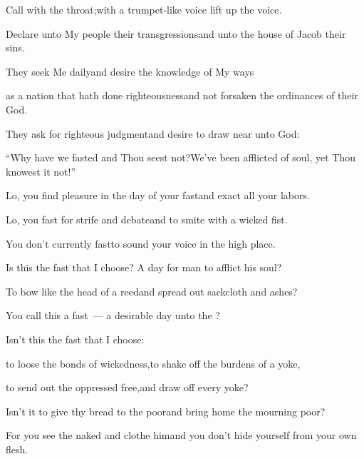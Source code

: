 
\begin{inparaenum}
  \pa{} Call with the throat;\pa{}with a trumpet-like voice lift up the voice.%

  \pb{}Declare unto My people their transgressions\pa{}and unto the house of Jacob their sins.%

  \pb{} They seek Me daily\pa{}and desire the knowledge of My ways%

  \pb{}as a nation that hath done righteousness\pa{}and not forsaken the ordinances of their God.%

  \pb{}They ask for righteous judgment\pa{}and desire to draw near unto God:%

  \pb{} ``Why have we fasted and Thou seest not?\pa{}We've been afflicted of soul, yet Thou knowest it not!''%

  \pb{}Lo, you find pleasure in the day of your fast\pa{}and exact all your labors.%

  \pb{} Lo, you fast for strife and debate\pa{}and to smite with a wicked fist.%

  \pb{}You don't currently fast\pa{}to sound your voice in the high place.%

  \pb{} Is this the fast that I choose?%
  \pa{}A day for man to afflict his soul?%

  \pb{}To bow like the head of a reed\pa{}and spread out sackcloth and ashes?%

  \pb{}You call this a fast~--- a desirable day unto the \lord?%

  \pc{} Isn't this the fast that I choose:%

  \pb{}to loose the bonds of wickedness,\pa{}to shake off the burdens of a yoke,%

  \pb{}to send out the oppressed free,\pa{}and draw off every yoke?%

  \pb{} Isn't it to give thy bread to the poor\pa{}and bring home the mourning poor?%

  \pb{}For you see the naked and clothe him\pa{}and you don't hide yourself from your own flesh.%


\end{inparaenum}
